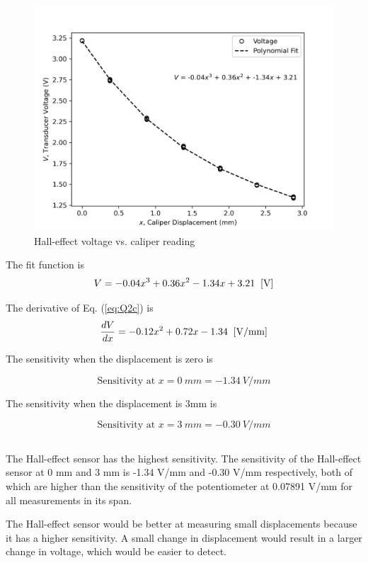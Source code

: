 \begin{figure}[h]
    \centering
    \includegraphics[width=0.8\linewidth]{matplotlib/Q2c.png}
    \caption{Hall-effect voltage vs. caliper reading}
    \label{fig:Q2c}
\end{figure}

The fit function is 
\begin{equation}
    V = -0.04x^3 + 0.36x^2 - 1.34x + 3.21 \;\; [\si[]{V}] \label{eq:Q2c}
\end{equation}

The derivative of Eq. (\ref{eq:Q2c}) is
\begin{equation}
    \frac{dV}{dx} = -0.12x^2 + 0.72x - 1.34 \;\; [\si[]{V/mm}] \label{eq:Q2c-derivative}
\end{equation}  

The sensitivity when the displacement is zero is

\[
  \boxed{\text{Sensitivity at } x = \qty{0}{mm} = \qty{-1.34}{V/mm}}  
\]

The sensitivity when the displacement is 3mm is

\[
    \boxed{\text{Sensitivity at } x = \qty{3}{mm} = \qty{-0.30}{V/mm}}
\]

\FloatBarrier
\subsection{}

The Hall-effect sensor has the highest sensitivity. The sensitivity of the Hall-effect sensor at 0 mm and 3 mm is -1.34 V/mm and -0.30 V/mm respectively, both
of which are higher than the sensitivity of the potentiometer at 0.07891 V/mm for all measurements in its span. 

The Hall-effect sensor would be better at measuring small displacements because it has a higher sensitivity. A small change in displacement would result in a larger
change in voltage, which would be easier to detect.